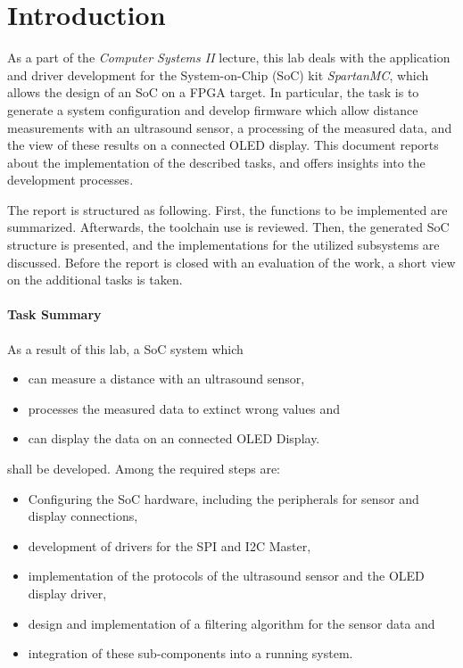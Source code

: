 \chapter{Introduction}
\label{cha:introduction}

As a part of the \emph{Computer Systems II} lecture, this lab deals with the 
application and driver development for the System-on-Chip (SoC) kit \emph{SpartanMC}, 
which allows the design of an SoC on a FPGA target.
In particular, the task is to generate a system configuration and develop firmware
which allow distance measurements with an ultrasound sensor, a processing of the
measured data, and the view of these results on a connected OLED display. This document
reports about the implementation of the described tasks, and offers insights into the 
development processes. 

The report is structured as following. First, the functions to be implemented are summarized.
Afterwards, the toolchain use is reviewed. Then, 
the generated SoC structure is presented, and the implementations for the utilized 
subsystems are discussed. Before the report is closed with an evaluation of the work, 
a short view on the additional tasks is taken.
\subsubsection{Task Summary}
\label{subsubsec:taskSummary}

As a result of this lab, a SoC system which 
\begin{itemize}
    \item can measure a distance with an ultrasound sensor,
    \item processes the measured data to extinct wrong values and
    \item can display the data on an connected OLED Display.
\end{itemize}

shall be developed. Among the required steps are:
\begin{itemize}
\item Configuring the SoC hardware, including the peripherals for sensor and display 
connections,
\item development of drivers for the SPI and I2C Master,
\item implementation of the protocols of the ultrasound sensor and the OLED display 
driver,
\item design and implementation of a filtering algorithm for  the sensor data and
\item integration of these sub-components into a running system.
\end{itemize}


